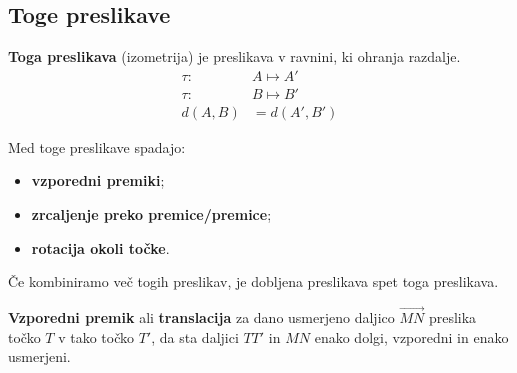         


        
        \subsection*{Toge preslikave}
            
            \begin{definicija}
                \textbf{Toga preslikava} (izometrija) je preslikava v ravnini, ki ohranja razdalje.
                \begin{align*}
                    \tau:~ &A \mapsto A' \\ 
                    \tau:~ &B \mapsto B' \\ 
                    d(A,B)&=d(A',B')
                \end{align*}
            \end{definicija}

            
                Med toge preslikave spadajo:
                    \begin{itemize}
                        \item \textbf{vzporedni premiki};
                        \item \textbf{zrcaljenje preko premice/premice};
                        \item \textbf{rotacija okoli točke}.
                    \end{itemize}

                Če kombiniramo več togih preslikav, je dobljena preslikava spet toga preslikava.

                
        


        

            
                \textbf{Vzporedni premik} ali \textbf{translacija} za dano usmerjeno daljico $\overrightarrow{MN}$ preslika točko $T$ v tako točko $T'$, da sta daljici $TT'$ in $MN$ enako dolgi, vzporedni in enako usmerjeni. \\  %
                

